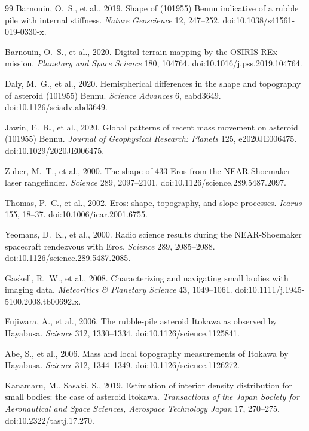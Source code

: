 \documentclass[11pt,a4paper]{article}
\begin{document}
\begin{thebibliography}{99}
Barnouin, O.~S., et al., 2019. Shape of (101955) Bennu indicative of a
rubble pile with internal stiffness. \emph{Nature Geoscience} 12,
247--252. doi:10.1038/s41561-019-0330-x.

Barnouin, O.~S., et al., 2020. Digital terrain mapping by the
OSIRIS-REx mission. \emph{Planetary and Space Science} 180, 104764.
doi:10.1016/j.pss.2019.104764.

Daly, M.~G., et al., 2020. Hemispherical differences in the shape and
topography of asteroid (101955) Bennu. \emph{Science Advances} 6,
eabd3649. doi:10.1126/sciadv.abd3649.

Jawin, E.~R., et al., 2020. Global patterns of recent mass movement on
asteroid (101955) Bennu. \emph{Journal of Geophysical Research: Planets}
125, e2020JE006475. doi:10.1029/2020JE006475.

Zuber, M.~T., et al., 2000. The shape of 433 Eros from the NEAR-Shoemaker
laser rangefinder. \emph{Science} 289, 2097--2101.
doi:10.1126/science.289.5487.2097.

Thomas, P.~C., et al., 2002. Eros: shape, topography, and slope processes.
\emph{Icarus} 155, 18--37. doi:10.1006/icar.2001.6755.

Yeomans, D.~K., et al., 2000. Radio science results during the
NEAR-Shoemaker spacecraft rendezvous with Eros. \emph{Science}
289, 2085--2088. doi:10.1126/science.289.5487.2085.

Gaskell, R.~W., et al., 2008. Characterizing and navigating small bodies
with imaging data. \emph{Meteoritics \& Planetary Science} 43, 1049--1061.
doi:10.1111/j.1945-5100.2008.tb00692.x.

Fujiwara, A., et al., 2006. The rubble-pile asteroid Itokawa as observed
by Hayabusa. \emph{Science} 312, 1330--1334. doi:10.1126/science.1125841.

Abe, S., et al., 2006. Mass and local topography measurements of Itokawa
by Hayabusa. \emph{Science} 312, 1344--1349. doi:10.1126/science.1126272.

Kanamaru, M., Sasaki, S., 2019. Estimation of interior density distribution
for small bodies: the case of asteroid Itokawa. \emph{Transactions of the
Japan Society for Aeronautical and Space Sciences, Aerospace Technology
Japan} 17, 270--275. doi:10.2322/tastj.17.270.


\end{thebibliography}
\end{document}

